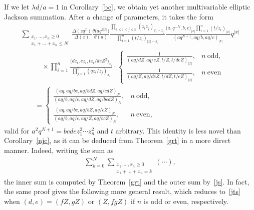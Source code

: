 \documentclass[pdftex]{sigma}
\numberwithin{equation}{section}
\begin{document}
If we let $\lambda d/a=1$ in Corollary~\ref{bc}, we obtain yet another multivariable elliptic Jackson summation. After a change of parameters, it takes the form
\begin{gather}
\sum_{\substack{x_1,\dots,x_n\geq 0\\x_1+\dots+x_n\leq N}}\frac{\Delta(zq^x)}{\Delta(z)}
\frac{\theta\big(aq^{2|x|}\big)}{\theta(a)}\frac{\prod\limits_{1\leq i<j\leq n}(z_iz_j)_{x_i+x_j}}{\prod\limits_{i=1}^n(t/z_i)_{|x|-x_i}}
\frac{\big(a,q^{-N},b,c\big)_{|x|}\prod\limits_{i=1}^n(t/z_i)_{|x|}}{(aq^{N+1},aq/b,aq/c)_{|x|}} q^{|x|}\nonumber\\
\qquad\quad{}\times\prod\limits_{i=1}^n\frac{\big(dz_i,ez_i,tz_i/deZ^2\big)_{x_i}}{\prod\limits_{j=1}^n(qz_i/z_j)_{x_i}}\cdot
\begin{cases}
\displaystyle\frac{1}{(aq/dZ,aq/eZ,t/Z,t/deZ)_{|x|}}, & n~\text{odd},\\[4mm]
\displaystyle\frac{1}{(aq/Z,aq/deZ,t/dZ,t/eZ)_{|x|}}, & n~\text{even}
\end{cases}\nonumber\\
\qquad{} =\begin{cases}
\displaystyle\frac{(aq,aq/bc,aq/bdZ,aq/cdZ)_N}{(aq/b,aq/c,aq/dZ,aq/bcdZ)_N}, & n~\text{odd},\\[4mm]
\displaystyle\frac{(aq,aq/bc,aq/bZ,aq/cZ)_N}{(aq/b,aq/c,aq/Z,aq/bcZ)_N}, & n~\text{even},
\end{cases}\label{jts}
\end{gather}
valid for $a^2q^{N+1}=bcde z_1^2\dotsm z_n^2$ and $t$ arbitrary. This identity is less novel than Corollary~\ref{njc}, as it can be deduced from Theorem~\ref{grt} in a more direct manner. Indeed, writing the sum as
\begin{gather*}\sum_{k=0}^N\sum_{\substack{x_1,\dots,x_n\geq 0\\x_1+\dots+x_n= k}}(\dotsm), \end{gather*}
the inner sum is computed by Theorem~\ref{grt} and the outer sum by~\eqref{js}. In fact, the same proof gives the following more general result, which reduces to~\eqref{jts} when $(d,e)=(fZ,gZ)$ or $(Z,fgZ)$ if $n$ is odd or even, respectively.
\end{document}
